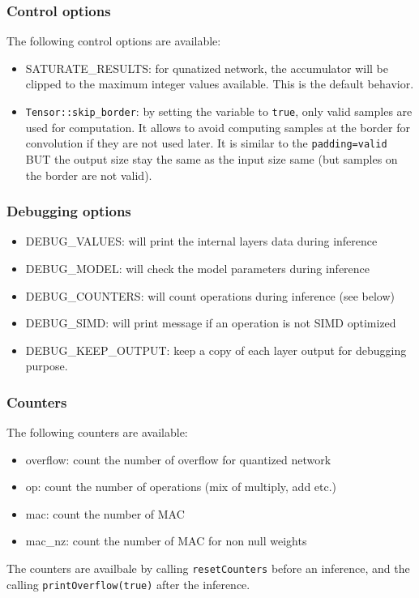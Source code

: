 \documentclass[10pt,a4paper]{article}
\begin{document}
\subsubsection{Control options}
The following control options are available:
\begin{itemize}
\item  \textrm{SATURATE\_RESULTS}: for qunatized network, the accumulator will be clipped to the maximum integer values available. This is the default behavior.
\item \texttt{Tensor::skip\_border}: by setting the variable to \texttt{true}, only valid samples are used for computation. It allows to avoid computing samples at the border for convolution if they are not used later. It is similar to the \texttt{padding=valid} BUT the output size stay the same as the input size same (but samples on the border are not valid).
\end{itemize}


\subsubsection{Debugging options}
\begin{itemize}
\item \textrm{DEBUG\_VALUES}: will print the internal layers data during inference
\item \textrm{DEBUG\_MODEL}: will check the model parameters during inference
\item \textrm{DEBUG\_COUNTERS}: will count operations during inference (see below)
\item \textrm{DEBUG\_SIMD}: will print message if an operation is not SIMD optimized
\item \textrm{DEBUG\_KEEP\_OUTPUT}: keep a copy of each layer output for debugging purpose.
\end{itemize}

\subsubsection{Counters}
The following counters are available:
\begin{itemize}
\item overflow: count the number of overflow for quantized network
\item op: count the number of operations (mix of multiply, add etc.)
\item mac: count the number of MAC
\item mac\_nz: count the number of MAC for non null weights
\end{itemize}
The counters are availbale by calling \texttt{resetCounters} before an inference, and the calling \texttt{printOverflow(true)} after the inference.
\end{document}

